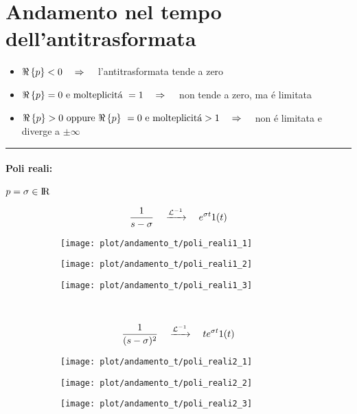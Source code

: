 \documentclass[../main.tex]{subfiles}
\begin{document}
	\section{Andamento nel tempo dell'antitrasformata}
	\begin{itemize}
		\item $ \Re \left\lbrace p \right\rbrace < 0 \quad \Rightarrow \quad $ l'antitrasformata tende a zero
		\item $ \re{p} = 0\ \text{e molteplicit\'{a}}\ = 1 \quad \Rightarrow \quad $ non tende a zero, ma \'{e} limitata
		\item $ \re{p} > 0\ \text{oppure}\ \re{p}\ = 0\ \text{e molteplicit\'{a}} > 1 \quad \Rightarrow \quad $ non \'{e} limitata e diverge a $ \pm \infty $
	\end{itemize}
	\rule{\linewidth}{0.4pt}
	\paragraph{Poli reali:} $ p = \sigma \in \rm I\!R $
	\begin{figure}[h!]
		\centering
		\[ \frac{1}{s-\sigma} \quad \xrightarrow{\mathcal{L}^{-1}} \quad e^{\sigma t} 1(t) \]
		\begin{subfigure}{0.3\textwidth}
			\texttt{[image: plot/andamento\_t/poli\_reali1\_1]}
		\end{subfigure}
		\begin{subfigure}{0.3\textwidth}
			\texttt{[image: plot/andamento\_t/poli\_reali1\_2]}
		\end{subfigure}
		\begin{subfigure}{0.3\textwidth}
			\texttt{[image: plot/andamento\_t/poli\_reali1\_3]}
		\end{subfigure}
	\end{figure}\\
	\begin{figure}[h!]
		\[ \frac{1}{(s-\sigma)^2} \quad \xrightarrow{\mathcal{L}^{-1}} \quad t e^{\sigma t} 1(t) \]
		\centering
		\begin{subfigure}{0.3\textwidth}
			\texttt{[image: plot/andamento\_t/poli\_reali2\_1]}
		\end{subfigure}
		\begin{subfigure}{0.3\textwidth}
			\texttt{[image: plot/andamento\_t/poli\_reali2\_2]}
		\end{subfigure}
		\begin{subfigure}{0.3\textwidth}
			\texttt{[image: plot/andamento\_t/poli\_reali2\_3]}
		\end{subfigure}
	\end{figure}\\
\end{document}
